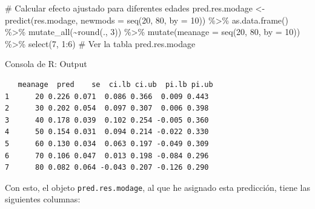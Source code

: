 \documentclass[
  bookmarksnumbered]{article}
\newenvironment{Shaded}{\begin{snugshade}}{\end{snugshade}}
\newcommand{\AttributeTok}[1]{\textcolor[rgb]{0.00,0.34,0.68}{#1}}
\newcommand{\CommentTok}[1]{\textcolor[rgb]{0.54,0.53,0.53}{#1}}
\newcommand{\DecValTok}[1]{\textcolor[rgb]{0.69,0.50,0.00}{#1}}
\newcommand{\FunctionTok}[1]{\textcolor[rgb]{0.39,0.29,0.61}{#1}}
\newcommand{\NormalTok}[1]{\textcolor[rgb]{0.12,0.11,0.11}{#1}}
\newcommand{\OtherTok}[1]{\textcolor[rgb]{0.00,0.43,0.16}{#1}}
\newcommand{\SpecialCharTok}[1]{\textcolor[rgb]{0.24,0.68,0.91}{#1}}
\begin{document}
\begin{Shaded}
\begin{Highlighting}[]
\CommentTok{\# Calcular efecto ajustado para diferentes edades}
\NormalTok{pred.res.modage }\OtherTok{\textless{}{-}} \FunctionTok{predict}\NormalTok{(res.modage, }\AttributeTok{newmods =} \FunctionTok{seq}\NormalTok{(}\DecValTok{20}\NormalTok{, }\DecValTok{80}\NormalTok{, }\AttributeTok{by =} \DecValTok{10}\NormalTok{)) }\SpecialCharTok{\%\textgreater{}\%} 
  \FunctionTok{as.data.frame}\NormalTok{() }\SpecialCharTok{\%\textgreater{}\%} 
  \FunctionTok{mutate\_all}\NormalTok{(}\SpecialCharTok{\textasciitilde{}}\FunctionTok{round}\NormalTok{(., }\DecValTok{3}\NormalTok{)) }\SpecialCharTok{\%\textgreater{}\%} 
  \FunctionTok{mutate}\NormalTok{(}\AttributeTok{meanage =} \FunctionTok{seq}\NormalTok{(}\DecValTok{20}\NormalTok{, }\DecValTok{80}\NormalTok{, }\AttributeTok{by =} \DecValTok{10}\NormalTok{)) }\SpecialCharTok{\%\textgreater{}\%} 
  \FunctionTok{select}\NormalTok{(}\DecValTok{7}\NormalTok{, }\DecValTok{1}\SpecialCharTok{:}\DecValTok{6}\NormalTok{)}
\CommentTok{\# Ver la tabla}
\NormalTok{pred.res.modage}
\end{Highlighting}
\end{Shaded}

\begin{ROut}{Consola de R: Output~\thetcbcounter}
                \begin{footnotesize}
                \begin{verbatim}   meanage  pred    se  ci.lb ci.ub  pi.lb pi.ub
1      20 0.226 0.071  0.086 0.366  0.009 0.443
2      30 0.202 0.054  0.097 0.307  0.006 0.398
3      40 0.178 0.039  0.102 0.254 -0.005 0.360
4      50 0.154 0.031  0.094 0.214 -0.022 0.330
5      60 0.130 0.034  0.063 0.197 -0.049 0.309
6      70 0.106 0.047  0.013 0.198 -0.084 0.296
7      80 0.082 0.064 -0.043 0.207 -0.126 0.290
 \end{verbatim}
                \end{footnotesize}
                \end{ROut}

Con esto, el objeto \texttt{pred.res.modage}, al que he asignado esta predicción, tiene las siguientes columnas:
\end{document}
